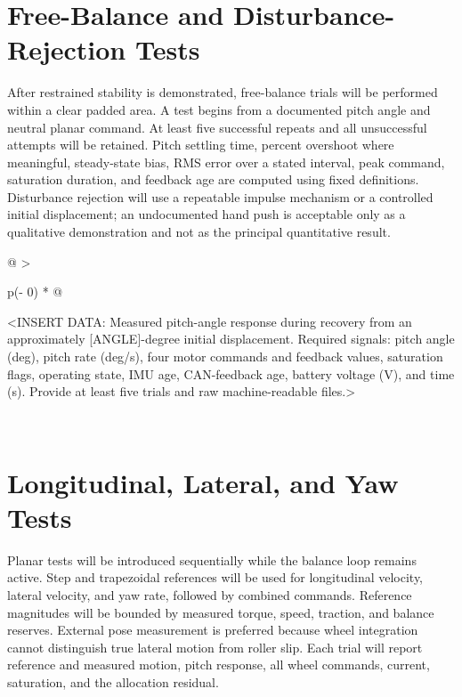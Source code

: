 \section{Free-Balance and Disturbance-Rejection Tests}\label{free-balance-and-disturbance-rejection-tests}

After restrained stability is demonstrated, free-balance trials will be
performed within a clear padded area. A test begins from a documented
pitch angle and neutral planar command. At least five successful repeats
and all unsuccessful attempts will be retained. Pitch settling time,
percent overshoot where meaningful, steady-state bias, RMS error over a
stated interval, peak command, saturation duration, and feedback age are
computed using fixed definitions. Disturbance rejection will use a
repeatable impulse mechanism or a controlled initial displacement; an
undocumented hand push is acceptable only as a qualitative demonstration
and not as the principal quantitative result.

\begin{longtable}[]{@{}
  >{\raggedright\arraybackslash}p{(\columnwidth - 0\tabcolsep) * }@{}}
\toprule\noalign{}
\begin{minipage}[b]{\linewidth}\raggedright
\textless INSERT DATA: Measured pitch-angle response during recovery
from an approximately [ANGLE]-degree initial displacement. Required
signals: pitch angle (deg), pitch rate (deg\slash{}s), four motor commands and
feedback values, saturation flags, operating state, IMU age,
CAN-feedback age, battery voltage (V), and time (s). Provide at least
five trials and raw machine-readable files.\textgreater{}
\end{minipage} \\
\midrule\noalign{}
\endhead
\bottomrule\noalign{}
\endlastfoot
\end{longtable}

\section{Longitudinal, Lateral, and Yaw Tests}\label{longitudinal-lateral-and-yaw-tests}

Planar tests will be introduced sequentially while the balance loop
remains active. Step and trapezoidal references will be used for
longitudinal velocity, lateral velocity, and yaw rate, followed by
combined commands. Reference magnitudes will be bounded by measured
torque, speed, traction, and balance reserves. External pose measurement
is preferred because wheel integration cannot distinguish true lateral
motion from roller slip. Each trial will report reference and measured
motion, pitch response, all wheel commands, current, saturation, and the
allocation residual.

